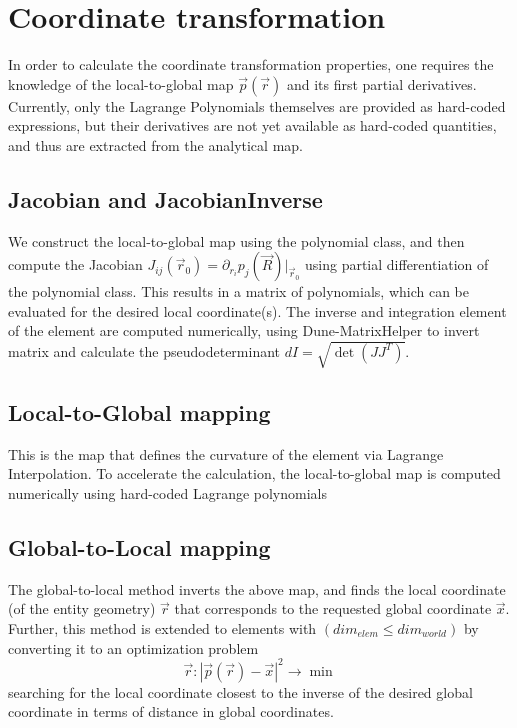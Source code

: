 \section{Coordinate transformation}

In order to calculate the coordinate transformation properties, one requires the knowledge of the local-to-global map $\vec{p}(\vec{r})$ and its first partial derivatives. Currently, only the Lagrange Polynomials themselves are provided as hard-coded expressions, but their derivatives are not yet available as hard-coded quantities, and thus are extracted from the analytical map.

\subsection{Jacobian and JacobianInverse}

We construct the local-to-global map using the polynomial class, and then compute the Jacobian $J_{ij}(\vec{r}_0) = \partial_{r_i} p_j (\vec{R}) |_{\vec{r}_0}$ using partial differentiation of the polynomial class. This results in a matrix of polynomials, which can be evaluated for the desired local coordinate(s). The inverse and integration element of the element are computed numerically, using Dune-MatrixHelper to invert matrix and calculate the pseudodeterminant $dI = \sqrt{\det(JJ^T)}$. \\

\subsection{Local-to-Global mapping}

This is the map that defines the curvature of the element via Lagrange Interpolation. To accelerate the calculation, the local-to-global map is computed numerically using hard-coded Lagrange polynomials

\subsection{Global-to-Local mapping}

The global-to-local method inverts the above map, and finds the local coordinate (of the entity geometry) $\vec{r}$ that corresponds to the requested global coordinate $\vec{x}$. Further, this method is extended to elements with $(dim_{elem} \leq dim_{world})$ by converting it to an optimization problem
\begin{equation}
  \label{eq-theory-mapping-optimization}
  \vec{r} : |\vec{p}(\vec{r}) - \vec{x} |^2 \rightarrow \min
\end{equation} 
searching for the local coordinate closest to the inverse of the desired global coordinate in terms of distance in global coordinates. \\

